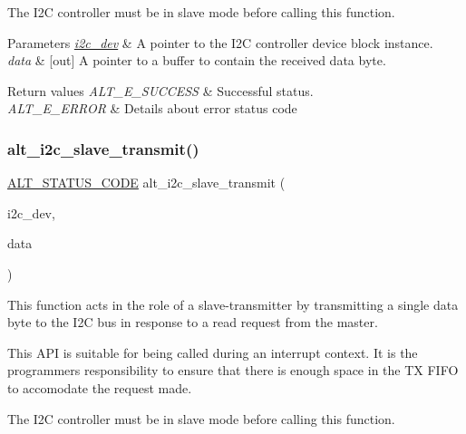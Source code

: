 The I2C controller must be in slave mode before calling this function.


\begin{DoxyParams}{Parameters}
{\em \mbox{\hyperlink{structi2c__dev}{i2c\+\_\+dev}}} & A pointer to the I2C controller device block instance.\\
\hline
{\em data} & \mbox{[}out\mbox{]} A pointer to a buffer to contain the received data byte.\\
\hline
\end{DoxyParams}

\begin{DoxyRetVals}{Return values}
{\em A\+L\+T\+\_\+\+E\+\_\+\+S\+U\+C\+C\+E\+SS} & Successful status. \\
\hline
{\em A\+L\+T\+\_\+\+E\+\_\+\+E\+R\+R\+OR} & Details about error status code \\
\hline
\end{DoxyRetVals}
\mbox{\label{group__ALT__I2C_ga3137e57044cb1f6d1b8ce9b09baf61e3}} 
\subsubsection{\texorpdfstring{alt\_i2c\_slave\_transmit()}{alt\_i2c\_slave\_transmit()}}
{\footnotesize\ttfamily \mbox{\hyperlink{hwlib_8h_abdb0d369f069723ca55d6c94bcaaaa12}{A\+L\+T\+\_\+\+S\+T\+A\+T\+U\+S\+\_\+\+C\+O\+DE}} alt\+\_\+i2c\+\_\+slave\+\_\+transmit (\begin{DoxyParamCaption}\item[{\mbox{\hyperlink{structALT__I2C__DEV__s}{A\+L\+T\+\_\+\+I2\+C\+\_\+\+D\+E\+V\+\_\+t}} $\ast$}]{i2c\+\_\+dev,  }\item[{const uint8\+\_\+t}]{data }\end{DoxyParamCaption})}

This function acts in the role of a slave-\/transmitter by transmitting a single data byte to the I2C bus in response to a read request from the master.

This A\+PI is suitable for being called during an interrupt context. It is the programmer\textquotesingle{}s responsibility to ensure that there is enough space in the TX F\+I\+FO to accomodate the request made.

The I2C controller must be in slave mode before calling this function.


